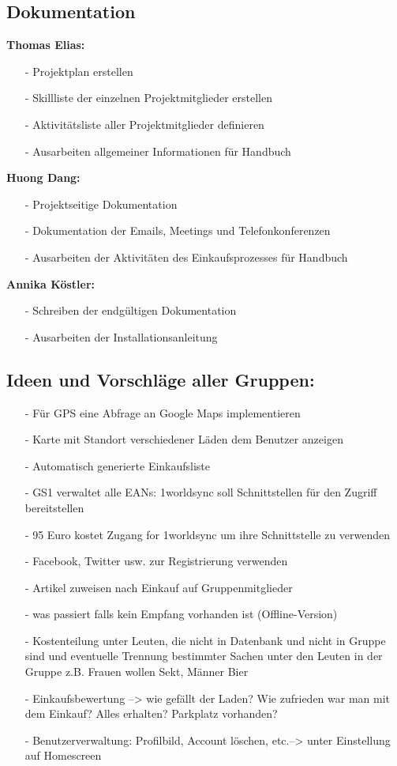 \documentclass[12pt,a4paper]{article}
\begin{document}
\newpage
\subsection{Dokumentation}
\textbf{Thomas Elias:}
\begin{itemize}
\item[-] Projektplan erstellen 
\item[-] Skillliste der einzelnen Projektmitglieder erstellen
\item[-] Aktivitätsliste aller Projektmitglieder definieren
\item[-] Ausarbeiten allgemeiner Informationen für Handbuch
\end{itemize}

\textbf{Huong Dang:}
\begin{itemize}
\item[-] Projektseitige Dokumentation
\item[-] Dokumentation der Emails, Meetings und Telefonkonferenzen
\item[-] Ausarbeiten der Aktivitäten des Einkaufsprozesses für Handbuch 
\end{itemize}

\textbf{Annika Köstler:}
\begin{itemize}
\item[-] Schreiben der endgültigen Dokumentation
\item[-] Ausarbeiten der Installationsanleitung 
\end{itemize}

\newpage
\subsection{Ideen und Vorschläge aller Gruppen:}
\begin{itemize}
\item[-] Für GPS eine Abfrage an Google Maps implementieren
\item[-] Karte mit Standort verschiedener Läden dem Benutzer anzeigen
\item[-] Automatisch generierte Einkaufsliste
\item[-] GS1 verwaltet alle EANs: 1worldsync soll Schnittstellen für den Zugriff bereitstellen
\item[-] 95 Euro kostet Zugang for 1worldsync um ihre Schnittstelle zu verwenden
\item[-] Facebook, Twitter usw. zur Registrierung verwenden
\item[-] Artikel zuweisen nach Einkauf auf Gruppenmitglieder 
\item[-] was passiert falls kein Empfang vorhanden ist (Offline-Version)
\item[-] Kostenteilung unter Leuten, die nicht in Datenbank und nicht in Gruppe sind und eventuelle Trennung bestimmter Sachen unter den Leuten in der Gruppe z.B. Frauen wollen Sekt, Männer Bier
\item[-] Einkaufsbewertung --> wie gefällt der Laden? Wie zufrieden war man mit dem Einkauf? Alles erhalten? Parkplatz 
vorhanden?
\item[-] Benutzerverwaltung: Profilbild, Account löschen, etc.--> unter Einstellung auf Homescreen
\end{itemize}
\end{document}
